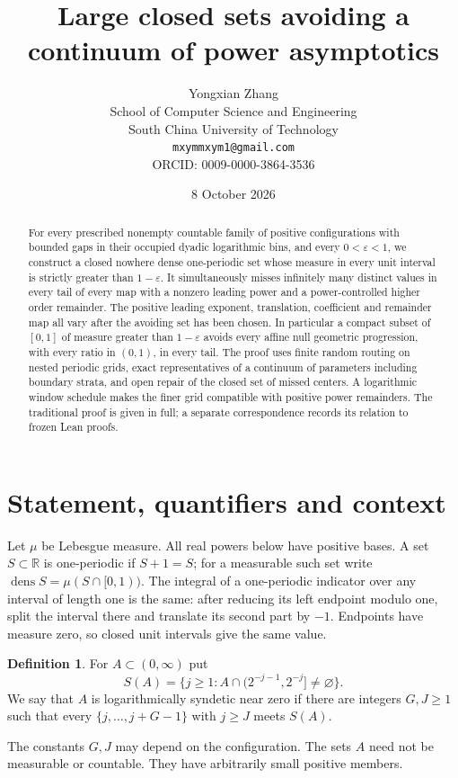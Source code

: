 \documentclass[11pt]{article}
\title{Large closed sets avoiding a continuum of power asymptotics}
\author{Yongxian Zhang\\[2pt]\small School of Computer Science and Engineering\\\small South China University of Technology\\\small\texttt{mxymmxym1@gmail.com}\\\small ORCID: 0009-0000-3864-3536}
\date{8 October 2026}
\theoremstyle{definition}
\newtheorem{definition}[theorem]{Definition}
\theoremstyle{remark}
\newcommand{\R}{\mathbb R}
\newcommand{\dens}{\operatorname{dens}}
\begin{document}
\maketitle
\begin{abstract}
For every prescribed nonempty countable family of positive configurations with
bounded gaps in their occupied dyadic logarithmic bins, and every
$0<\varepsilon<1$, we construct a closed nowhere dense one-periodic set whose
measure in every unit interval is strictly greater than $1-\varepsilon$.
It simultaneously misses infinitely many distinct values in every tail of every
map with a nonzero leading power and a power-controlled higher order remainder.
The positive leading exponent, translation, coefficient and remainder map all
vary after the avoiding set has been chosen. In particular a compact subset of
$[0,1]$ of measure greater than $1-\varepsilon$ avoids every affine null geometric
progression, with every ratio in $(0,1)$, in every tail. The proof uses finite
random routing on nested periodic grids, exact representatives of a continuum
of parameters including boundary strata, and open repair of the closed set of
missed centers. A logarithmic window schedule makes the finer grid compatible
with positive power remainders. The traditional proof is given in full; a
separate correspondence records its relation to frozen Lean proofs.
\end{abstract}

\section{Statement, quantifiers and context}\label{sec:statement}
Let $\mu$ be Lebesgue measure. All real powers below have positive bases.
A set $S\subset\R$ is one-periodic if $S+1=S$; for a measurable such set write
$\dens S=\mu(S\cap[0,1))$. The integral of a one-periodic indicator over any
interval of length one is the same: after reducing its left endpoint modulo
one, split the interval there and translate its second part by $-1$.
Endpoints have measure zero, so closed unit intervals give the same value.

\begin{definition}\label{def:syndetic}
For $A\subset(0,\infty)$ put
\[
 S(A)=\{j\geq1:A\cap(2^{-j-1},2^{-j}]\ne\varnothing\}.
\]
We say that $A$ is logarithmically syndetic near zero if there are integers
$G,J\geq1$ such that every $\{j,\ldots,j+G-1\}$ with $j\geq J$ meets $S(A)$.
\end{definition}
The constants $G,J$ may depend on the configuration. The sets $A$ need not be
measurable or countable. They have arbitrarily small positive members.
\end{document}
